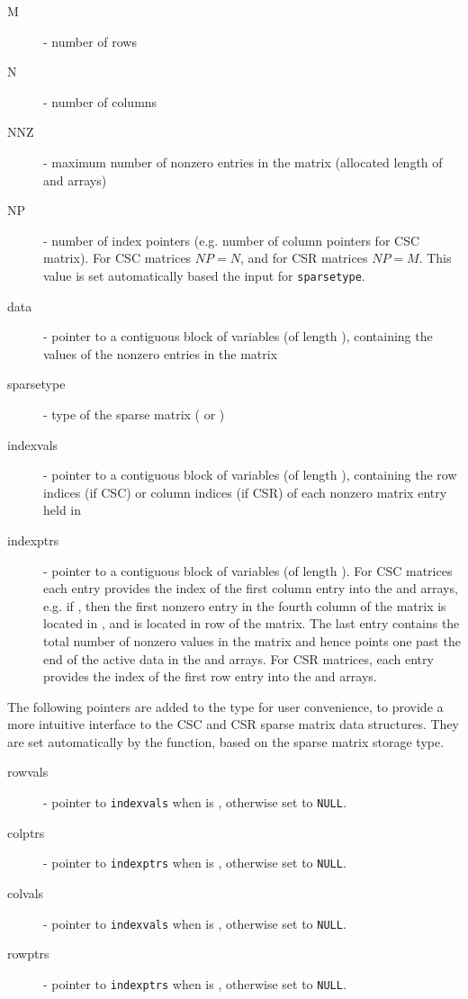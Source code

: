 \begin{description}
  \item[M]  - number of rows
  \item[N]  - number of columns
  \item[NNZ]  - maximum number of nonzero entries in the matrix
    (allocated length of  and  arrays)
  \item[NP]  - number of index pointers (e.g. number of column pointers for 
    CSC matrix). For CSC matrices $NP=N$, and for CSR matrices $NP=M$. This 
    value is set automatically based the input for \verb|sparsetype|. 
  \item[data]  - pointer to a contiguous block of 
    variables (of length ), containing the values of the
    nonzero entries in the matrix
  \item[sparsetype]  - type of the sparse matrix ( or )
  \item[indexvals] - pointer to a contiguous block of  variables
    (of length ), containing the row indices (if CSC) or column
   indices (if CSR) of each nonzero matrix entry held in 
  \item[indexptrs]  - pointer to a contiguous block of 
    variables (of length ). For CSC matrices each 
    entry provides the index of the first column entry into the 
     and  arrays, e.g. if , then 
    the first nonzero entry in the fourth column of the matrix is 
    located in , and is located in row  of the 
    matrix.  The last entry contains the total number of nonzero values in 
    the matrix and hence points one past the end of the active data in the 
     and  arrays. For CSR matrices, each entry provides 
    the index of the first row entry into the  and  
    arrays.
\end{description}
\noindent The following pointers are added to the  type for user convenience, 
to provide a more intuitive interface to the CSC and CSR sparse matrix data structures. They are set 
automatically by the  function, based on the sparse matrix storage type. 
\begin{description}
  \item[rowvals] - pointer to \verb|indexvals| when  is ,
    otherwise set to \verb|NULL|.
  \item[colptrs] - pointer to \verb|indexptrs| when  is ,
    otherwise set to \verb|NULL|.
  \item[colvals] - pointer to \verb|indexvals| when  is ,
    otherwise set to \verb|NULL|.
  \item[rowptrs] - pointer to \verb|indexptrs| when  is ,
    otherwise set to \verb|NULL|.
\end{description}
